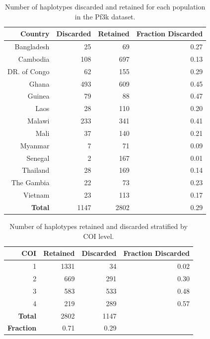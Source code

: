 \documentclass[9pt,lineno]{elife}
\begin{document}
\begin{table}[ht]
\centering
\begin{tabular}{r|r|r|r}
\textbf{Country}  & \textbf{Discarded} & \textbf{Retained} &\textbf{Fraction Discarded} \\
\hline
Bangladesh & 25 & 69 & 0.27 \\
Cambodia & 108 & 697 & 0.13 \\
DR. of Congo & 62 & 155 & 0.29 \\
Ghana & 493 & 609 & 0.45 \\
Guinea & 79 & 88 & 0.47 \\
Laos & 28 & 110 & 0.20 \\
Malawi & 233 & 341 & 0.41 \\
Mali & 37 & 140 & 0.21 \\
Myanmar & 7 & 71 & 0.09 \\
Senegal & 2 & 167 & 0.01\\
Thailand & 28 & 169 & 0.14 \\
The Gambia & 22 & 73 & 0.23 \\
Vietnam & 23 & 113 & 0.17\\
\hline
\textbf{Total} & 1147 & 2802 & 0.29
\end{tabular}
\vspace{.2cm}
\caption{Number of haplotypes discarded and retained for each population in the Pf3k dataset.}
\label{table:haps-discarded-by-country}
\end{table}


\begin{table}[ht]
\centering
\begin{tabular}{r|r|r|r}
\textbf{COI}  & \textbf{Retained} & \textbf{Discarded} & \textbf{Fraction Discarded} \\
\hline
1 & 1331 & 34 & 0.02 \\
2 & 669 & 291 & 0.30 \\
3 & 583 & 533 & 0.48 \\
4 & 219 & 289 & 0.57 \\
\hline
\textbf{Total} & 2802 & 1147 &  \\
\hline
\textbf{Fraction} & 0.71 & 0.29 & \\
\end{tabular}
\vspace{.2cm}
\caption{Number of haplotypes retained and discarded stratified by COI level.}
\label{table:haps-discarded-by-COI}
\end{table}
\end{document}
